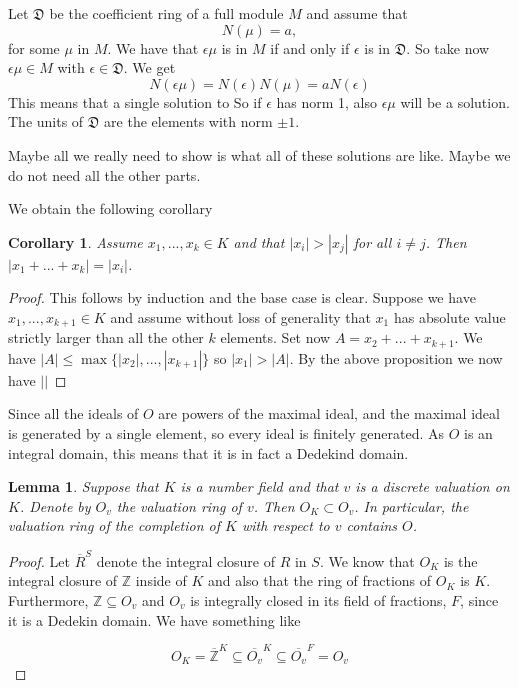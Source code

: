 \documentclass{article}
\newtheorem{corollary}{Corollary}[section]
\newtheorem{lemma}{Lemma}[section]
\newcommand{\mfrak}[1]{\mathfrak{#1}}
\newcommand{\mbb}[1]{\mathbb{#1}}
\begin{document}
Let $\mfrak{D}$ be the coefficient ring of a full module $M$ and assume that 
$$N(\mu) = a,$$
for some $\mu$ in $M$. We have that $\epsilon \mu$ is in $M$ if and only if  $\epsilon$ is in $\mfrak{D}$. So take now $\epsilon \mu \in M$ with $\epsilon \in \mfrak{D}$. We get
$$N(\epsilon \mu) = N(\epsilon)N(\mu) = a N(\epsilon)$$
This means that a single solution to 
So if $\epsilon$ has norm 1, also $\epsilon \mu$ will be a solution. The units of $\mfrak{D}$ are the elements with norm $\pm 1$. 

Maybe all we really need to show is what all of these solutions are like. Maybe we do not need all the other parts. 


We obtain the following corollary
\begin{corollary}
    Assume $x_1, ..., x_k \in K$ and that $|x_i| > |x_j|$ for all $i \neq j$. Then $|x_1 + ... + x_k| = |x_i|$.
\end{corollary}
\begin{proof}
    This follows by induction and the base case is clear. Suppose we have $x_1, ..., x_{k+1} \in K$ and assume without loss of generality that $x_1$ has absolute value strictly larger than all the other $k$ elements. Set now $A = x_2 + ... + x_{k+1}$. We have $|A| \leq \max\{|x_2|, ... , |x_{k+1}| \}$ so  $|x_1| > |A|$. By the above proposition we now have $|| $
\end{proof}


Since all the ideals of $O$ are powers of the maximal ideal, and the maximal ideal is generated by a single element, so every ideal is finitely generated. As $O$ is an integral domain, this means that it is in fact a Dedekind domain. 

\begin{lemma}
    Suppose that $K$ is a number field and that $v$ is a discrete valuation on $K$. Denote by $O_v$ the valuation ring of $v$. Then $O_K \subset O_v$. In particular, the valuation ring of the completion of $K$ with respect to $v$ contains $O$.
\end{lemma}

\begin{proof}
    Let $\overline{R}^S$ denote the integral closure of $R$ in $S$. We know that $O_K$ is the integral closure of $\mbb Z$ inside of $K$ and also that the ring of fractions of $O_K$ is $K$. Furthermore, $\mbb Z \subseteq O_v$ and $O_v$ is integrally closed in its field of fractions, $F$, since it is a Dedekin domain. We have something like 

    $$O_K = \overline {\mbb{Z}}^K \subseteq \overline {O_v}^K \subseteq \overline {O_v}^F = O_v$$ 
    
\end{proof}
\end{document}
